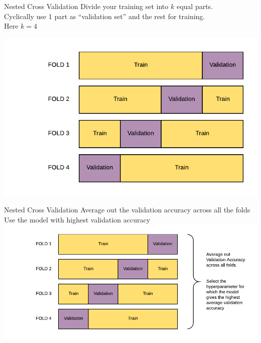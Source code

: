 \documentclass{beamer}
\begin{document}
	\begin{frame}{Nested Cross Validation}
	Divide your training set into $k$ equal parts.\\
	 Cyclically use 1 part as ``validation set'' and the rest for training.\\
	Here $k = 4$
	\begin{center}
	\includegraphics[scale=0.7]{../assets/bias-variance/diagrams/cross-validation}
	\end{center}
	\end{frame}

	\begin{frame}{Nested Cross Validation}
	Average out the validation accuracy across all the folds\\
	Use the model with highest validation accuracy\\
	\includegraphics[width = \textwidth]{../assets/bias-variance/diagrams/cross-validation-avg}
	\end{frame}
\end{document}
